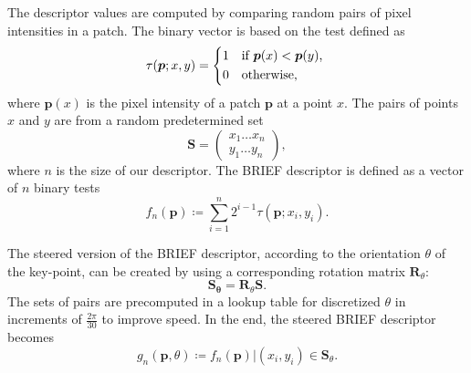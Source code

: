 The descriptor values are computed by comparing random pairs of pixel intensities in a patch. The binary vector is based on the test defined as
\begin{equation}
    \tau(\boldsymbol{p};x,y)=
    \begin{cases*}
        1 & if $\boldsymbol{p}(x) < \boldsymbol{p}(y)$, \\
        0 & otherwise,
    \end{cases*}
\end{equation}
where $\boldsymbol{p}(x)$ is the pixel intensity of a patch $\boldsymbol{p}$ at a point $x$. The pairs of points $x$ and $y$ are from a random predetermined set
\begin{equation}
    \boldsymbol{S} =
    \begin{pmatrix}
        x_1 \dots x_n \\
        y_1 \dots y_n
    \end{pmatrix},
\end{equation}
where $n$ is the size of our descriptor. The BRIEF descriptor is defined as a vector of $n$ binary tests
\begin{equation}
    f_n(\boldsymbol{p}) \coloneqq \sum_{i=1}^{n} 2^{i-1}\tau(\boldsymbol{p};x_i, y_i).
\end{equation}

The steered version of the BRIEF descriptor, according to the orientation $\theta$ of the key-point, can be created by using a corresponding rotation matrix $\boldsymbol{R}_\theta$:
\begin{equation}
    \boldsymbol{S_\theta} = \boldsymbol{R}_\theta \boldsymbol{S}.
\end{equation}
The sets of pairs are precomputed in a lookup table for discretized $\theta$ in increments of $\frac{2\pi}{30}$ to improve speed. In the end, the steered BRIEF descriptor becomes
\begin{equation}
    g_n(\boldsymbol{p}, \theta) \coloneqq f_n(\boldsymbol{p}) | (x_i, y_i) \in \boldsymbol{S}_\theta.
\end{equation}
